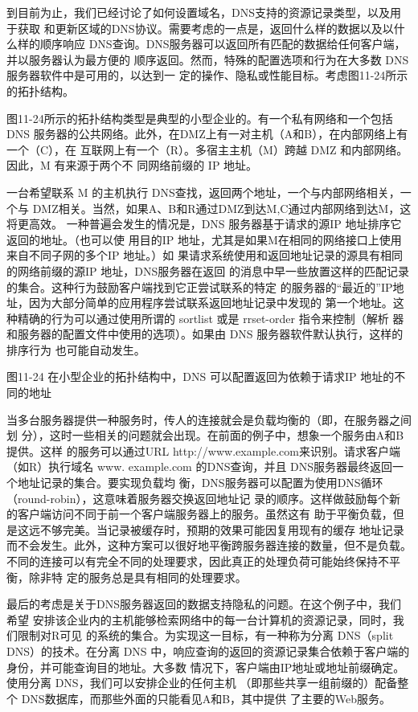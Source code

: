 到目前为止，我们已经讨论了如何设置域名，DNS支持的资源记录类型，以及用于获取
和更新区域的DNS协议。需要考虑的一点是，返回什么样的数据以及以什么样的顺序响应
DNS查询。DNS服务器可以返回所有匹配的数据给任何客户端，并以服务器认为最方便的
顺序返回。然而，特殊的配置选项和行为在大多数 DNS服务器软件中是可用的，以达到一
定的操作、隐私或性能目标。考虑图11-24所示的拓扑结构。

图11-24所示的拓扑结构类型是典型的小型企业的。有一个私有网络和一个包括 DNS
服务器的公共网络。此外，在DMZ上有一对主机（A和B），在内部网络上有一个（C），在
互联网上有一个（R）。多宿主主机（M）跨越 DMZ 和内部网络。因此，M 有来源于两个不
同网络前缀的 IP 地址。

一台希望联系 M 的主机执行 DNS查找，返回两个地址，一个与内部网络相关，一个与
DMZ相关。当然，如果A、B和R通过DMZ到达M,C通过内部网络到达M，这将更高效。
一种普遍会发生的情况是，DNS 服务器基于请求的源IP 地址排序它返回的地址。（也可以使
用目的IP 地址，尤其是如果M在相同的网络接口上使用来自不同子网的多个IP 地址。）如
果请求系统使用和返回地址记录的源具有相同的网络前缀的源IP 地址，DNS服务器在返回
的消息中早一些放置这样的匹配记录的集合。这种行为鼓励客户端找到它正尝试联系的特定
的服务器的“最近的”IP地址，因为大部分简单的应用程序尝试联系返回地址记录中发现的
第一个地址。这种精确的行为可以通过使用所谓的 sortlist 或是 rrset-order 指令来控制（解析
器和服务器的配置文件中使用的选项）。如果由 DNS 服务器软件默认执行，这样的排序行为
也可能自动发生。

图11-24 在小型企业的拓扑结构中，DNS 可以配置返回为依赖于请求IP 地址的不同的地址

当多台服务器提供一种服务时，传人的连接就会是负载均衡的（即，在服务器之间划
分），这时一些相关的问题就会出现。在前面的例子中，想象一个服务由A和B提供。这样
的服务可以通过URL http://www.example.com来识别。请求客户端（如R）执行域名 www.
example.com 的DNS查询，并且 DNS服务器最终返回一个地址记录的集合。要实现负载均
衡，DNS服务器可以配置为使用DNS循环（round-robin），这意味着服务器交换返回地址记
录的顺序。这样做鼓励每个新的客户端访问不同于前一个客户端服务器上的服务。虽然这有
助于平衡负载，但是这远不够完美。当记录被缓存时，预期的效果可能因复用现有的缓存
地址记录而不会发生。此外，这种方案可以很好地平衡跨服务器连接的数量，但不是负载。
不同的连接可以有完全不同的处理要求，因此真正的处理负荷可能始终保持不平衡，除非特
定的服务总是具有相同的处理要求。

最后的考虑是关于DNS服务器返回的数据支持隐私的问题。在这个例子中，我们希望
安排该企业内的主机能够检索网络中的每一台计算机的资源记录，同时，我们限制对R可见
的系统的集合。为实现这一目标，有一种称为分离 DNS（split DNS）的技术。在分离 DNS
中，响应查询的返回的资源记录集合依赖于客户端的身份，并可能查询目的地址。大多数
情况下，客户端由IP地址或地址前缀确定。使用分离 DNS，我们可以安排企业的任何主机
（即那些共享一组前缀的）配备整个 DNS数据库，而那些外面的只能看见A和B，其中提供
了主要的Web服务。

